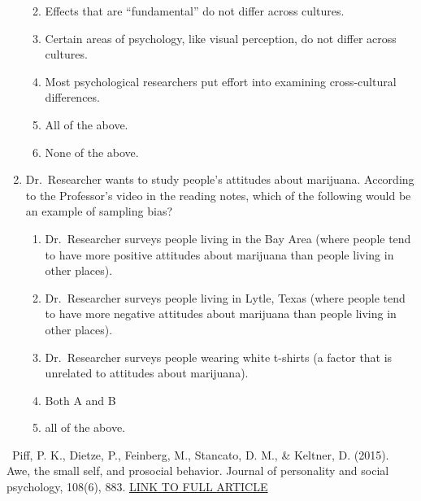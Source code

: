 \documentclass[
  letterpaper,
  DIV=11,
  numbers=noendperiod,
  oneside]{scrreprt}
\begin{document}
\begin{enumerate}
  \begin{enumerate}
  \def\labelenumii{\arabic{enumii}.}
  \item
    Effects that are ``fundamental'' do not differ across cultures.
  \item
    Certain areas of psychology, like visual perception, do not differ
    across cultures.
  \item
    Most psychological researchers put effort into examining
    cross-cultural differences.
  \item
    All of the above.
  \item
    None of the above.
  \end{enumerate}
\item
  Dr.~Researcher wants to study people's attitudes about marijuana.
  According to the Professor's video in the reading notes, which of the
  following would be an example of sampling bias?

  \begin{enumerate}
  \def\labelenumii{\arabic{enumii}.}
  \item
    Dr.~Researcher surveys people living in the Bay Area (where people
    tend to have more positive attitudes about marijuana than people
    living in other places).
  \item
    Dr.~Researcher surveys people living in Lytle, Texas (where people
    tend to have more negative attitudes about marijuana than people
    living in other places).
  \item
    Dr.~Researcher surveys people wearing white t-shirts (a factor that
    is unrelated to attitudes about marijuana).
  \item
    Both A and B
  \item
    all of the above.
  \end{enumerate}
\end{enumerate}

~Piff, P. K., Dietze, P., Feinberg, M., Stancato, D. M., \& Keltner, D.
(2015). Awe, the small self, and prosocial behavior. Journal of
personality and social psychology, 108(6), 883.
\href{https://bpb-us-e1.wpmucdn.com/sites.gatech.edu/dist/c/359/files/2018/08/Awe-and-Prosocial-Behavior.pdf?bid=359}{LINK
TO FULL ARTICLE}

\hfill\break
\end{document}
